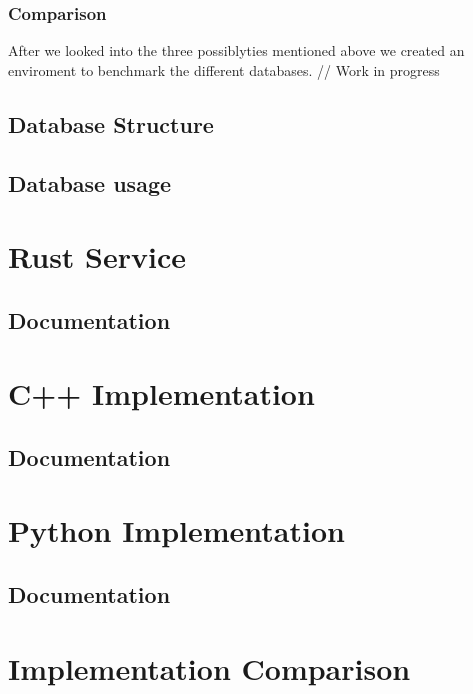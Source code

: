 \subsubsection{Comparison}
After we looked into the three possiblyties mentioned above we created an enviroment to benchmark the different databases. // Work in progress

\subsection{Database Structure}


\subsection{Database usage}


\section{Rust Service}
\subsection{Documentation}

\section{C++ Implementation}
\subsection{Documentation}

\section{Python Implementation}
\subsection{Documentation}

\section{Implementation Comparison}

\filbreak
